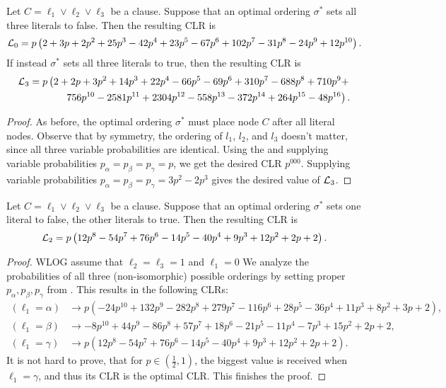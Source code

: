 \begin{lemma}
    \label{lemma:000/111CLR}
    Let $C=\ell_1 \lor \ell_2 \lor \ell_3$ be a clause.
    Suppose that an optimal ordering $\sigma^*$ sets all three literals to false.
    Then the resulting CLR is \[
        \mathcal{L}_0 = p \left(2 + 3 p + 2 p^2 + 25 p^3 - 42 p^4 + 23 p^5 - 67 p^6 + 102 p^7 - 
   31 p^8 - 24 p^9 + 12 p^{10}\right).
    \]
    If instead $\sigma^*$ sets all three literals to true, then the resulting CLR is  
    \begin{align*}
     \mathcal{L}_3 = p \left(2 + 2 p + 3 p^2 + 14 p^3 + 22 p^4 - 66 p^5 - 69 p^6 + 310 p^7 - 688 p^8 + 710 p^9 + \right.\\
     \left.756 p^{10} - 2581 p^{11} + 2304 p^{12} - 558 p^{13} - 
   372 p^{14} + 264 p^{15} - 48 p^{16} \right).
    \end{align*}
\end{lemma}
\begin{proof}
    As before, the optimal ordering $\sigma^*$ must place node $C$ after all literal nodes. Observe that by symmetry, the ordering of $l_1$, $l_2$, and $l_3$ doesn't matter, since all three variable probabilities are identical. Using the  and supplying variable probabilities $p_\alpha = p_\beta = p_\gamma = p$, we get the desired CLR $p^000$.
    Supplying variable probabilities $p_\alpha = p_\beta = p_\gamma = 3p^2 - 2p^3$ gives the desired value of $\mathcal{L}_3$.
\end{proof}

\begin{lemma}
    \label{lemma:110CLR}
    Let $C=\ell_1 \lor \ell_2 \lor \ell_3$ be a clause.
    Suppose that an optimal ordering $\sigma^*$ sets one literal to false, the other literals to true.
    Then the resulting CLR is \[
	\mathcal{L}_2 = p \left(12 p^8-54 p^7+76 p^6-14 p^5-40 p^4+9 p^3+12 p^2+2 p+2\right).
    \]
\end{lemma}

\begin{proof}
    WLOG assume that $ \ell_2 = \ell_3 = 1 $ and $ \ell_1 = 0 $
    We analyze the probabilities of all three (non-isomorphic) possible orderings by setting proper $ p_\alpha, p_\beta, p_\gamma $ from . 
    This results in the following CLRs: \begin{align*}
        (\ell_1=\alpha) &\to p \left(-24 p^{10}+132 p^9-282 p^8+279 p^7-116 p^6+28 p^5-36 p^4+11 p^3+8 p^2+3 p+2\right),\\
        (\ell_1=\beta) &\to -8 p^{10}+44 p^9-86 p^8+57 p^7+18 p^6-21 p^5-11 p^4-7 p^3+15 p^2+2 p+2,\\
        (\ell_1=\gamma) &\to p \left(12 p^8-54 p^7+76 p^6-14 p^5-40 p^4+9 p^3+12 p^2+2 p+2\right).
    \end{align*}
    It is not hard to prove, that for $ p \in \left( \frac 12, 1 \right) $, the biggest value is received when $ \ell_1=\gamma $, and thus its CLR is the optimal CLR.
    This finishes the proof.
\end{proof}

